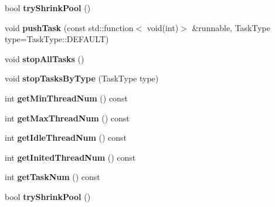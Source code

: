 \begin{DoxyCompactItemize}
\mbox{\label{classcocos2d_1_1experimental_1_1ThreadPool_a8f807288766b6765b0fe14d05dd7a477}} 
bool {\bfseries try\+Shrink\+Pool} ()
\item 
\mbox{\label{classcocos2d_1_1experimental_1_1ThreadPool_a44a4d0f1f4140d7c0faf7f8b77d134fc}} 
void {\bfseries push\+Task} (const std\+::function$<$ void(int)$>$ \&runnable, Task\+Type type=Task\+Type\+::\+D\+E\+F\+A\+U\+LT)
\item 
\mbox{\label{classcocos2d_1_1experimental_1_1ThreadPool_a4964e4140ab8b1a03470f301c617aea2}} 
void {\bfseries stop\+All\+Tasks} ()
\item 
\mbox{\label{classcocos2d_1_1experimental_1_1ThreadPool_a9d2d03736025fc57b37d63ee2ffcf431}} 
void {\bfseries stop\+Tasks\+By\+Type} (Task\+Type type)
\item 
\mbox{\label{classcocos2d_1_1experimental_1_1ThreadPool_ad8c342b4139194783a478bc2db31ceda}} 
int {\bfseries get\+Min\+Thread\+Num} () const
\item 
\mbox{\label{classcocos2d_1_1experimental_1_1ThreadPool_aad563f014a6276f2c48979ae2a22efe8}} 
int {\bfseries get\+Max\+Thread\+Num} () const
\item 
\mbox{\label{classcocos2d_1_1experimental_1_1ThreadPool_a40ff3c0f42d3ecb71565c0520d732a89}} 
int {\bfseries get\+Idle\+Thread\+Num} () const
\item 
\mbox{\label{classcocos2d_1_1experimental_1_1ThreadPool_a68700e241d5669acfc004f0b8061c6a8}} 
int {\bfseries get\+Inited\+Thread\+Num} () const
\item 
\mbox{\label{classcocos2d_1_1experimental_1_1ThreadPool_a3f6cb122485d908ddfa2d74dd96f6afe}} 
int {\bfseries get\+Task\+Num} () const
\item 
\mbox{\label{classcocos2d_1_1experimental_1_1ThreadPool_a8f807288766b6765b0fe14d05dd7a477}} 
bool {\bfseries try\+Shrink\+Pool} ()
\end{DoxyCompactItemize}

